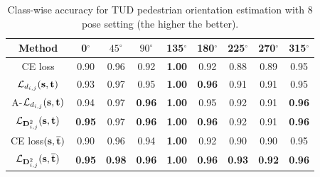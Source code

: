 \begin{table}[t] 
\renewcommand\arraystretch{1.2}
\scriptsize
\label{tab:different_nets}
\begin{center}
\begin{tabular}{|c|c|c|c|c|c|c|c|c|}
\hline
Method&0$^{\circ}$&$45^{\circ}$&$90^{\circ}$&135$^{\circ}$&180$^{\circ}$&225$^{\circ}$&270$^{\circ}$&315$^{\circ}$\\\hline\hline
    
 
CE loss\cite{raza2018appearance}&0.90&0.96&0.92&\textbf{1.00}&0.92&0.88&0.89&0.95\\\hline\hline      



$\mathcal{L}_{d_{i,j}}(\rm{\textbf{s},{\textbf{t}}})$&0.93&0.97&0.95&\textbf{1.00}&\textbf{0.96}&0.91&0.91&0.95\\\hline 


A-${\mathcal{L}_{d_{i,j}}}{(\rm{{\textbf{s},{\textbf{t}}}})}$&0.94&0.97&\textbf{0.96}&\textbf{1.00}&0.95&0.92&0.91&\textbf{0.96}\\\hline    


$\mathcal{L}_{{\rm\textbf{D}}_{i,j}^2}{(\rm{{\textbf{s},{\textbf{t}}}})}$&\textbf{0.95}&0.97&\textbf{0.96}&\textbf{1.00}&\textbf{0.96}&0.92&0.91&\textbf{0.96}\\\hline 

CE loss${(\rm{{\textbf{s},\overline{\textbf{t}}}})}$&{0.90}&{0.96}&{0.94}&\textbf{1.00}&{0.92}&{0.90}&{0.90}&{0.95}\\\hline 


$\mathcal{L}_{{\rm\textbf{D}}_{i,j}^2}{(\rm{{\textbf{s},\overline{\textbf{t}}}})}$&\textbf{0.95}&\textbf{0.98}&\textbf{0.96}&\textbf{1.00}&\textbf{0.96}&\textbf{0.93}&\textbf{0.92}&\textbf{0.96}\\\hline 
   
    
\end{tabular}\label{tab:2}
\end{center}
\caption{Class-wise accuracy for TUD pedestrian orientation estimation with 8 pose setting (the higher the better).}
\end{table}


